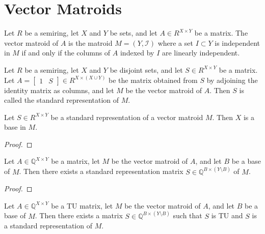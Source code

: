 \section{Vector Matroids}

\begin{definition}
    \label{def:full_repr}
    \leanok
    Let $R$ be a semiring, let $X$ and $Y$ be sets, and let $A \in R^{X \times Y}$ be a matrix. The vector matroid of $A$ is the matroid $M = (Y, \mathcal{I})$ where a set $I \subset Y$ is independent in $M$ if and only if the columns of $A$ indexed by $I$ are linearly independent.
\end{definition}

\begin{definition}
    \label{def:std_repr}
    \leanok
    Let $R$ be a semiring, let $X$ and $Y$ be disjoint sets, and let $S \in R^{X \times Y}$ be a matrix. Let $A = \begin{bmatrix} 1 & S \end{bmatrix} \in R^{X \times (X \cup Y)}$ be the matrix obtained from $S$ by adjoining the identity matrix as columns, and let $M$ be the vector matroid of $A$. Then $S$ is called the standard representation of $M$.
\end{definition}

\begin{lemma}
    \label{lem:std_repr_rows_base}
    \leanok
    Let $S \in R^{X \times Y}$ be a standard representation of a vector matroid $M$. Then $X$ is a base in $M$.
\end{lemma}

\begin{proof}
    \leanok
    \SeeLean
\end{proof}

\begin{lemma}
    \label{lem:full_repr_to_std_repr}
    \leanok
    Let $A \in \mathbb{Q}^{X \times Y}$ be a matrix, let $M$ be the vector matroid of $A$, and let $B$ be a base of $M$. Then there exists a standard representation matrix $S \in \mathbb{Q}^{B \times (Y \setminus B)}$ of $M$.
\end{lemma}

\begin{proof}
    \leanok
    \SeeLean
\end{proof}

\begin{lemma}
    \label{lem:TU_repr_to_TU_std_repr}
    \leanok
    Let $A \in \mathbb{Q}^{X \times Y}$ be a TU matrix, let $M$ be the vector matroid of $A$, and let $B$ be a base of $M$. Then there exists a matrix $S \in \mathbb{Q}^{B \times (Y \setminus B)}$ such that $S$ is TU and $S$ is a standard representation of $M$.
\end{lemma}

